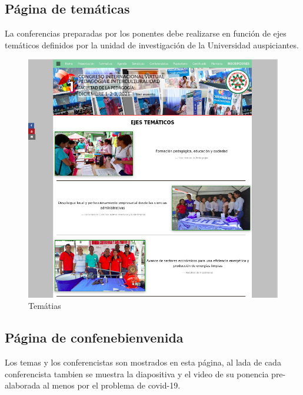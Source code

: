\documentclass[a4paper,14px]{article}
\begin{document}
\newpage
\subsection{Página de temáticas }
\label{sec:pagina-principal}

La conferencias preparadas por los ponentes debe realizarse en función de ejes temáticos definidos por la unidad de investigación de la Universidad auspiciantes.


\begin{figure}[H]
  \centering
  \includegraphics[scale=0.6]{tematicas.png}
  \caption{Temátias}
  \label{fig:arquitectura}
\end{figure}


\newpage
\subsection{Página de confenebienvenida }
\label{sec:pagina-principal}

Los temas y los conferencistas son mostrados en esta página, al lada de cada conferencista tambien se muestra la diapositiva y el video de su ponencia pre-alaborada al menos por el problema de covid-19.
\end{document}
